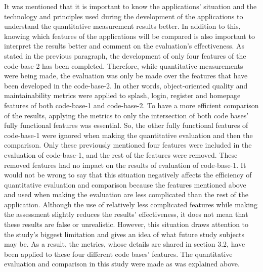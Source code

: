 It was mentioned that it is important to know the applications' situation and the technology and principles used during the development of the applications to understand the quantitative measurement results better. In addition to this, knowing which features of the applications will be compared is also important to interpret the results better and comment on the evaluation's effectiveness. As stated in the previous paragraph, the development of only four features of the code-base-2 has been completed. Therefore, while quantitative measurements were being made, the evaluation was only be made over the features that have been developed in the code-base-2. In other words, object-oriented quality and maintainability metrics were applied to splash, login, register and homepage features of both code-base-1 and code-base-2. To have a more efficient comparison of the results, applying the metrics to only the intersection of both code bases' fully functional features was essential. So, the other fully functional features of code-base-1 were ignored when making the quantitative evaluation and then the comparison. Only these previously mentioned four features were included in the evaluation of code-base-1, and the rest of the features were removed. These removed features had no impact on the results of evaluation of code-base-1. It would not be wrong to say that this situation negatively affects the efficiency of quantitative evaluation and comparison because the features mentioned above and used when making the evaluation are less complicated than the rest of the application. Although the use of relatively less complicated features while making the assessment slightly reduces the results' effectiveness, it does not mean that these results are false or unrealistic. However, this situation draws attention to the study's biggest limitation and gives an idea of what future study subjects may be. As a result, the metrics, whose details are shared in section 3.2, have been applied to these four different code bases' features. The quantitative evaluation and comparison in this study were made as was explained above.